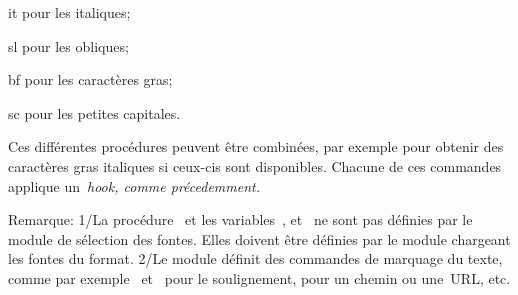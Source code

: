 \item it
  pour les italiques;

\item sl
  pour les obliques;

\item bf
  pour les caractères gras;

\item sc
  pour les petites capitales.

\enddescription
Ces différentes procédures peuvent être combinées, par exemple pour
obtenir des caractères gras italiques si ceux-cis sont
disponibles. Chacune de ces commandes applique un~\em{hook}, comme
précedemment.

Remarque: 1/La procédure~ et les
variables~,  et~ ne
sont pas définies par le module de sélection des fontes. Elles doivent
être définies par le module chargeant les fontes du format. 2/Le
module  définit des commandes de marquage du texte, comme
par exemple~ et~ pour le soulignement,  pour un
chemin ou une~URL, etc.

\bye

